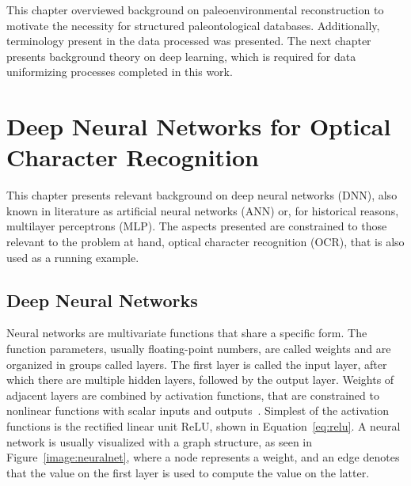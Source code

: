 \documentclass{article}
\begin{document}
This chapter overviewed background on paleoenvironmental 
reconstruction to motivate the necessity for structured paleontological 
databases. Additionally, terminology present in the data processed was presented.
The next chapter presents background theory on deep learning, which is required for data 
uniformizing processes completed in this work.

\section{Deep Neural Networks for Optical Character Recognition}


This chapter presents relevant background on deep neural networks (DNN), also known 
in literature as artificial neural networks (ANN) or, for historical reasons, multilayer perceptrons (MLP).
The aspects presented are constrained to those relevant to the problem at hand, optical character recognition (OCR),
that is also used as a running example.

\subsection{Deep Neural Networks}


Neural networks are multivariate functions that share a specific form.
The function parameters, usually floating-point numbers, are called weights and are organized in groups called layers.
The first layer is called the input layer, after which there are multiple hidden layers, followed by the output layer.
Weights of adjacent layers are combined by activation functions, that are constrained to nonlinear functions with 
scalar inputs and outputs~\cite{princebook}. Simplest of the activation functions is the rectified
linear unit ReLU, shown in Equation~\ref{eq:relu}. A neural network is usually visualized with a graph structure, as seen in Figure~\ref{image:neuralnet}, where a node represents a 
weight, and an edge denotes that the value on the first layer is used to compute the value on the latter.
\end{document}
